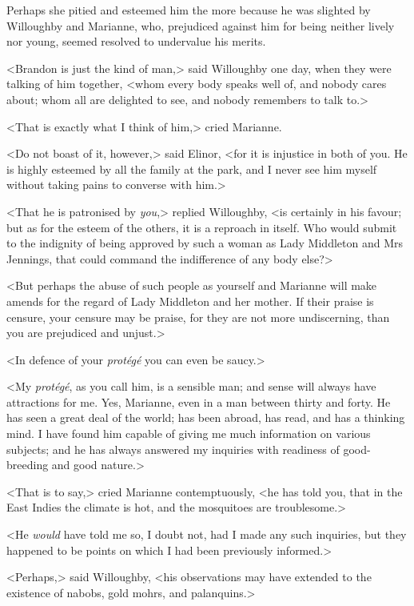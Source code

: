 Perhaps she pitied and esteemed him the more because he was slighted by Willoughby and Marianne, who, prejudiced against him for being neither lively nor young, seemed resolved to undervalue his merits.

<Brandon is just the kind of man,> said Willoughby one day, when they were talking of him together, <whom every body speaks well of, and nobody cares about; whom all are delighted to see, and nobody remembers to talk to.>

<That is exactly what I think of him,> cried Marianne.

<Do not boast of it, however,> said Elinor, <for it is injustice in both of you. He is highly esteemed by all the family at the park, and I never see him myself without taking pains to converse with him.>

<That he is patronised by \textit{you},> replied Willoughby, <is certainly in his favour; but as for the esteem of the others, it is a reproach in itself. Who would submit to the indignity of being approved by such a woman as Lady Middleton and Mrs Jennings, that could command the indifference of any body else?>

<But perhaps the abuse of such people as yourself and Marianne will make amends for the regard of Lady Middleton and her mother. If their praise is censure, your censure may be praise, for they are not more undiscerning, than you are prejudiced and unjust.>

<In defence of your \textit{protégé} you can even be saucy.>

<My \textit{protégé}, as you call him, is a sensible man; and sense will always have attractions for me. Yes, Marianne, even in a man between thirty and forty. He has seen a great deal of the world; has been abroad, has read, and has a thinking mind. I have found him capable of giving me much information on various subjects; and he has always answered my inquiries with readiness of good-breeding and good nature.>

<That is to say,> cried Marianne contemptuously, <he has told you, that in the East Indies the climate is hot, and the mosquitoes are troublesome.>

<He \textit{would} have told me so, I doubt not, had I made any such inquiries, but they happened to be points on which I had been previously informed.>

<Perhaps,> said Willoughby, <his observations may have extended to the existence of nabobs, gold mohrs, and palanquins.>

